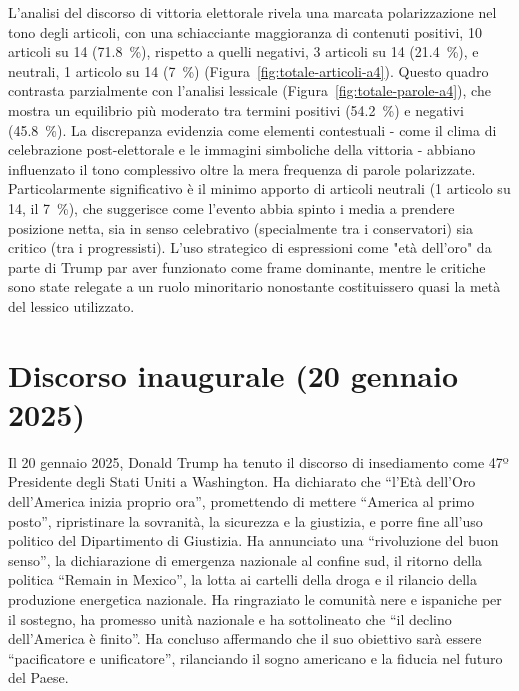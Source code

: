 L'analisi del discorso di vittoria elettorale rivela una marcata polarizzazione nel tono degli articoli, con una schiacciante maggioranza di contenuti positivi, 10 articoli su 14 (\SI{71.8}{\percent}), rispetto a quelli negativi, 3 articoli su 14 (\SI{21.4}{\percent}), e neutrali, 1 articolo su 14 (\SI{7}{\percent}) (Figura~\ref{fig:totale-articoli-a4}). Questo quadro contrasta parzialmente con l'analisi lessicale (Figura~\ref{fig:totale-parole-a4}), che mostra un equilibrio più moderato tra termini positivi (\SI{54.2}{\percent}) e negativi (\SI{45.8}{\percent}). La discrepanza evidenzia come elementi contestuali - come il clima di celebrazione post-elettorale e le immagini simboliche della vittoria - abbiano influenzato il tono complessivo oltre la mera frequenza di parole polarizzate. Particolarmente significativo è il minimo apporto di articoli neutrali (1 articolo su 14, il \SI{7}{\percent}), che suggerisce come l'evento abbia spinto i media a prendere posizione netta, sia in senso celebrativo (specialmente tra i conservatori) sia critico (tra i progressisti). L'uso strategico di espressioni come "età dell'oro" da parte di Trump par aver funzionato come frame dominante, mentre le critiche sono state relegate a un ruolo minoritario nonostante costituissero quasi la metà del lessico utilizzato.

\newpage
\section{Discorso inaugurale (20 gennaio 2025)}

Il 20 gennaio 2025, Donald Trump ha tenuto il discorso di insediamento come 47º Presidente degli Stati Uniti a Washington.
Ha dichiarato che “l’Età dell’Oro dell’America inizia proprio ora”, promettendo di mettere “America al primo posto”, ripristinare la sovranità, la sicurezza e la giustizia, e porre fine all’uso politico del Dipartimento di Giustizia.
Ha annunciato una “rivoluzione del buon senso”, la dichiarazione di emergenza nazionale al confine sud, il ritorno della politica “Remain in Mexico”, la lotta ai cartelli della droga e il rilancio della produzione energetica nazionale.
Ha ringraziato le comunità nere e ispaniche per il sostegno, ha promesso unità nazionale e ha sottolineato che “il declino dell’America è finito”.
Ha concluso affermando che il suo obiettivo sarà essere “pacificatore e unificatore”, rilanciando il sogno americano e la fiducia nel futuro del Paese.


